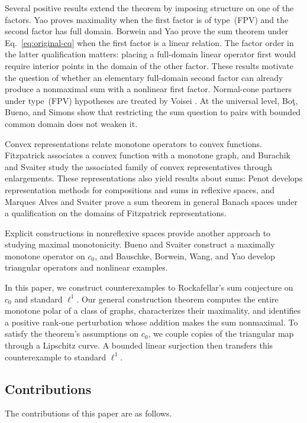 \documentclass[11pt]{article}
\theoremstyle{definition}
\theoremstyle{remark}
\begin{document}
Several positive results extend the theorem by imposing structure on one
of the factors. Yao \cite{yao2010} proves maximality when the first factor
is of type~(FPV) and the second factor has full domain. Borwein and Yao
\cite{borweinyao2012} prove the sum theorem under
Eq.~\eqref{eq:original-cq} when the first factor is a linear relation.
The factor order in the latter qualification matters: placing a
full-domain linear operator first would require interior points in the
domain of the other factor. These results motivate the question of
whether an elementary full-domain second factor can already produce a
nonmaximal sum with a nonlinear first factor.
Normal-cone partners under type~(FPV) hypotheses are treated by Voisei
\cite{voisei2010}. At the universal level, Bo\c{t}, Bueno, and Simons
\cite{botbuenosimons2016} show that restricting the sum question to pairs
with bounded common domain does not weaken it.

Convex representations relate monotone operators to convex functions.
Fitzpatrick \cite{fitzpatrick1988} associates a convex function with a
monotone graph, and Burachik and Svaiter \cite{burachiksvaiter2002}
study the associated family of convex representatives through enlargements.
These representations also yield results about sums: Penot
\cite{penot2004} develops representation methods for compositions and
sums in reflexive spaces, and Marques Alves and Svaiter
\cite{marquessvaiter2012} prove a sum theorem in general Banach spaces
under a qualification on the domains of Fitzpatrick representations.

Explicit constructions in nonreflexive spaces provide another approach
to studying maximal monotonicity. Bueno and Svaiter
\cite{buenosvaiter2011} construct a maximally monotone operator on $c_0$,
and Bauschke, Borwein, Wang, and Yao \cite{bauschkeetal2011} develop
triangular operators and nonlinear examples.

In this paper, we construct counterexamples to Rockafellar's sum
conjecture on $c_0$ and standard $\ell^1$. Our general construction
theorem computes the entire monotone polar of a class of graphs,
characterizes their maximality, and identifies a positive rank-one
perturbation whose addition makes the sum nonmaximal. To satisfy the
theorem's assumptions on $c_0$, we couple copies of the triangular map through a
Lipschitz curve. A bounded linear surjection then transfers this
counterexample to standard $\ell^1$. 

\subsection{Contributions}
The contributions of this paper are as follows.
\end{document}
